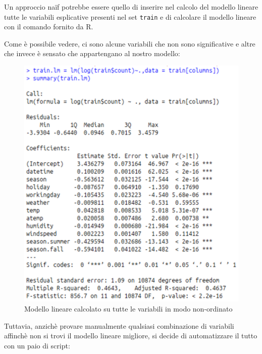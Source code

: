 Un approccio naïf potrebbe essere quello di inserire nel calcolo del modello
lineare tutte le variabili esplicative presenti nel set \texttt{train} e di
calcolare il modello lineare con il comando fornito da R.

Come è possibile vedere, ci sono alcune variabili che non sono significative e
altre che invece è sensato che appartengano al nostro modello:

\begin{figure}[H]
  \centering
  \includegraphics[width=.55\columnwidth]{images/lm-with-all-vars.eps}
  \caption{Modello lineare calcolato su tutte le variabili in modo
    non-ordinato}\label{fig:simpl-lm-log-qqplot}
\end{figure}

Tuttavia, anzichè provare manualmente qualsiasi combinazione di variabili
affinchè non si trovi il modello lineare migliore, si decide di automatizzare
il tutto con un paio di script:

